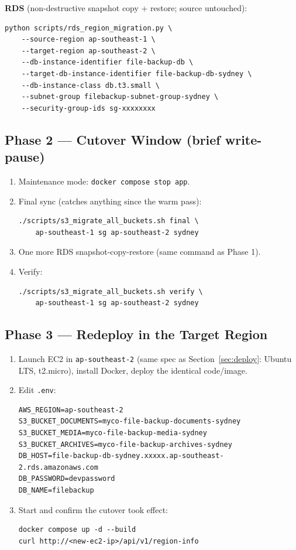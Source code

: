 \documentclass[10pt]{article}
\begin{document}
\textbf{RDS} (non-destructive snapshot copy + restore; source untouched):
\begin{lstlisting}[style=bashStyle]
python scripts/rds_region_migration.py \
    --source-region ap-southeast-1 \
    --target-region ap-southeast-2 \
    --db-instance-identifier file-backup-db \
    --target-db-instance-identifier file-backup-db-sydney \
    --db-instance-class db.t3.small \
    --subnet-group filebackup-subnet-group-sydney \
    --security-group-ids sg-xxxxxxxx
\end{lstlisting}

\subsection{Phase 2 --- Cutover Window (brief write-pause)}
\begin{enumerate}
  \item Maintenance mode: \texttt{docker compose stop app}.
  \item Final sync (catches anything since the warm pass):
\begin{lstlisting}[style=bashStyle]
./scripts/s3_migrate_all_buckets.sh final \
    ap-southeast-1 sg ap-southeast-2 sydney
\end{lstlisting}
  \item One more RDS snapshot-copy-restore (same command as Phase 1).
  \item Verify:
\begin{lstlisting}[style=bashStyle]
./scripts/s3_migrate_all_buckets.sh verify \
    ap-southeast-1 sg ap-southeast-2 sydney
\end{lstlisting}
\end{enumerate}

\subsection{Phase 3 --- Redeploy in the Target Region}
\begin{enumerate}
  \item Launch EC2 in \texttt{ap-southeast-2} (same spec as Section~\ref{sec:deploy}: Ubuntu LTS, t2.micro), install Docker, deploy the identical code/image.
  \item Edit \texttt{.env}:
\begin{lstlisting}[style=bashStyle]
AWS_REGION=ap-southeast-2
S3_BUCKET_DOCUMENTS=myco-file-backup-documents-sydney
S3_BUCKET_MEDIA=myco-file-backup-media-sydney
S3_BUCKET_ARCHIVES=myco-file-backup-archives-sydney
DB_HOST=file-backup-db-sydney.xxxxx.ap-southeast-2.rds.amazonaws.com
DB_PASSWORD=devpassword
DB_NAME=filebackup
\end{lstlisting}
  \item Start and confirm the cutover took effect:
\begin{lstlisting}[style=bashStyle]
docker compose up -d --build
curl http://<new-ec2-ip>/api/v1/region-info
\end{lstlisting}
\end{enumerate}
\end{document}
